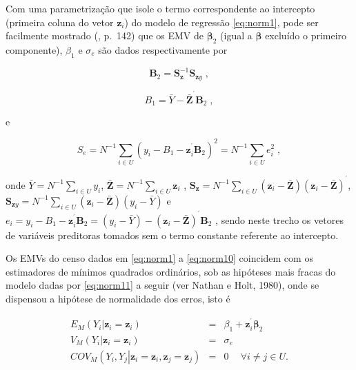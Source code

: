 \documentclass[]{book}
\theoremstyle{definition}
\theoremstyle{definition}
\theoremstyle{definition}
\theoremstyle{remark}
\begin{document}
Com uma parametrização que isole o termo correspondente ao intercepto
(primeira coluna do vetor \(\mathbf{z}_{i}\)) do modelo de regressão
\eqref{eq:norm1}, pode ser facilmente mostrado (\citep{Silva}, p.~142) que
os EMV de \(\mathbf{\beta }_{2}\) (igual a \(\mathbf{\beta }\) excluído
o primeiro componente), \(\beta _{1}\) e \(\sigma _{e}\) são dados
respectivamente por

\begin{equation}
\mathbf{B}_{2}=\mathbf{S}_{\mathbf{z}}^{-1}\mathbf{S}_{\mathbf{z}y}\;,
\label{eq:norm8}
\end{equation}

\begin{equation}
B_{1}=\bar{Y}-\mathbf{\bar{Z}}^{^{\prime }}\mathbf{B}_{2}\mathbf{\;,}
\label{eq:norm9}
\end{equation}

e

\begin{equation}
S_{e}=N^{-1}\sum\limits_{i\in U}\left( y_{i}-B_{1}-\mathbf{z}_{i}^{^{\prime
}}\mathbf{B}_{2}\right) ^{2}=N^{-1}\sum\limits_{i\in U}e_{i}^{2}\;,
\label{eq:norm10}
\end{equation}

onde \(\bar{Y}=N^{-1}\sum\limits_{i\in U}y_{i}\),
\(\mathbf{\bar{Z}}=N^{-1}\sum\limits_{i\in U}\mathbf{z}_{i}\) ,
\(\mathbf{S}_{\mathbf{z}}=N^{-1}\sum\limits_{i\in U}\left( \mathbf{z}_{i}-\mathbf{\bar{Z}}\right)\left( \mathbf{z}_{i}-\mathbf{\bar{Z}}\right) ^{^{\prime }}\),
\(\mathbf{S}_{ \mathbf{z}y}=N^{-1}\sum\limits_{i\in U}\left( \mathbf{z}_{i}-\mathbf{\bar{Z}}\right) \left( y_{i}-\bar{Y}\right)\)
e
\(e_{i}=y_{i}-B_{1}-\mathbf{z}_{i}^{^{\prime }}\mathbf{B}_{2}=\left( y_{i}-\bar{Y}\right) -\left( \mathbf{z}_{i}-\mathbf{\bar{Z}}\right) ^{^{\prime }}\mathbf{B}_{2}\)
, sendo neste trecho os vetores de variáveis preditoras tomados sem o
termo constante referente ao intercepto.

Os EMVs do censo dados em \eqref{eq:norm1} a \eqref{eq:norm10} coincidem com
os estimadores de mínimos quadrados ordinários, sob as hipóteses mais
fracas do modelo dadas por \eqref{eq:norm11} a seguir (ver Nathan e Holt,
1980), onde se dispensou a hipótese de normalidade dos erros, isto é

\begin{eqnarray}
E_{M}\left( \left. Y_{i}\right| \mathbf{z}_{i}=\mathbf{z}_{i}\right)
&=&\beta _{1}+\mathbf{z}_{i}^{^{\prime }}\mathbf{\beta }_{2}  \label{eq:norm11} \\
V_{M}\left( \left. Y_{i}\right| \mathbf{z}_{i}=\mathbf{z}_{i}\right)
&=&\sigma _{e}  \nonumber \\
COV_{M}\left( \left. Y_{i},Y_{j}\right| \mathbf{z}_{i}=\mathbf{z}_{i},
\mathbf{z}_{j}=\mathbf{z}_{j}\right) &=&0\ \quad \forall i\neq j\in U. 
\nonumber
\end{eqnarray}
\end{document}
